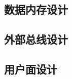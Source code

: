 \documentclass[lang=cn,a4paper,newtx]{elegantpaper}
\begin{document}
\begin{appendices}
  \subsection{数据内存设计}\label{sec:appendices:ram}
  

  \subsection{外部总线设计}\label{sec:appendices:externalbus}
  
  \subsection{用户面设计}\label{sec:appendices:user}
\end{appendices}
\end{document}
